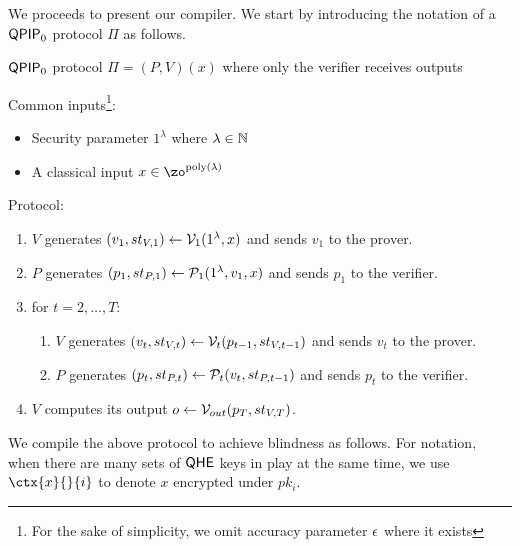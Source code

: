 \fi



We proceeds to present our compiler. We start by introducing the notation of a $\operatorname{\mathsf{QPIP}}_0$ protocol $\Pi$ as follows.

\begin{protocol}{$\operatorname{\mathsf{QPIP}}_0$ protocol $\Pi=(P, V)(x)$ where only the verifier receives outputs}
	
	Common inputs\footnote{For the sake of simplicity, we omit accuracy parameter $\epsilon$ where it exists}:
	\begin{itemize}
		\item Security parameter $1^\lambda$ where $\lambda\in\mathbb{N}$
		\item A classical input $x\in\zo^{\poly(\lambda)}$
	\end{itemize}

    Protocol:
	\begin{enumerate}
		\item $V$ generates $(v_1, st_{V, 1})\leftarrow\mathcal{V}_1(1^\lambda, x)$ and sends $v_1$ to the prover.
		\item $P$ generates $(p_1, st_{P, 1})\leftarrow\mathcal{P}_1(1^\lambda, v_1, x)$ and sends $p_1$ to the verifier.
		\item for $t=2,\ldots,T$:
		\begin{enumerate}
			\item $V$ generates $(v_t, st_{V, t})\leftarrow\mathcal{V}_t(p_{t-1}, st_{V, t-1})$ and sends $v_t$ to the prover.
			\item $P$ generates $(p_t, st_{P, t})\leftarrow\mathcal{P}_t(v_t, st_{P, t-1})$ and sends $p_t$ to the verifier.
		\end{enumerate}
		\item $V$ computes its output $o\leftarrow\mathcal{V}_{out}(p_T, st_{V, T})$.
	\end{enumerate}

\end{protocol}

We compile the above protocol to achieve blindness as follows.
For notation, when there are many sets of $\mathsf{QHE}$ keys in play at the same time,
we use $\ctx{x}{}{i}$ to denote $x$ encrypted under $pk_i$.



